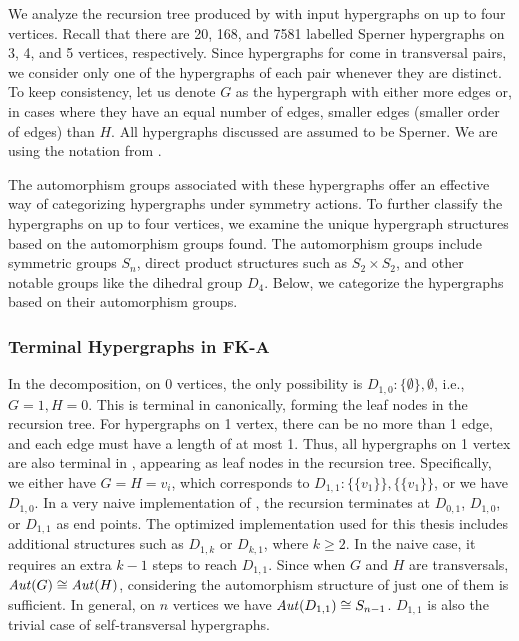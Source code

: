 We analyze the recursion tree produced by \FKA{} with input hypergraphs on up to four vertices. Recall that there are 20, 168, and 7581 labelled Sperner hypergraphs on 3, 4, and 5 vertices, respectively. Since hypergraphs for \FKA{} come in transversal pairs, we consider only one of the hypergraphs of each pair whenever they are distinct. To keep consistency, let us denote $G$ as the hypergraph with either more edges or, in cases where they have an equal number of edges, smaller edges (smaller order of edges) than $H$. All hypergraphs discussed are assumed to be Sperner. We are using the notation from \cite{SS24}.

The automorphism groups associated with these hypergraphs offer an effective way of categorizing hypergraphs under symmetry actions. To further classify the hypergraphs on up to four vertices, we examine the unique hypergraph structures based on the automorphism groups found. The automorphism groups include symmetric groups $S_n$, direct product structures such as $S_2\times S_2$, and other notable groups like the dihedral group $D_4$. Below, we categorize the hypergraphs based on their automorphism groups.

\subsubsection*{Terminal Hypergraphs in FK-A}

In the \FKA{} decomposition, on 0 vertices, the only possibility is $D_{1,0}:\{\emptyset\},\emptyset$, i.e., $G=1,H=0$. This is terminal in \FKA{} canonically, forming the leaf nodes in the recursion tree. For hypergraphs on 1 vertex, there can be no more than 1 edge, and each edge must have a length of at most 1. Thus, all hypergraphs on 1 vertex are also terminal in \FKA, appearing as leaf nodes in the recursion tree. Specifically, we either have $G=H=v_i$, which corresponds to $D_{1,1}:\{\{v_1\}\},\{\{v_1\}\}$, or we have $D_{1,0}$. In a very naive implementation of \FKA, the recursion terminates at $D_{0,1}$, $D_{1,0}$, or $D_{1,1}$ as end points. The optimized implementation used for this thesis includes additional structures such as $D_{1,k}$ or $D_{k,1}$, where $k\geq 2$. In the naive case, it requires an extra $k-1$ steps to reach $D_{1,1}$. Since when $G$ and $H$ are transversals, $\mathit{Aut}(G)\cong\mathit{Aut}(H)$, considering the automorphism structure of just one of them is sufficient. In general, on $n$ vertices we have $\mathit{Aut}(D_{1,1})\cong S_{n-1}$. $D_{1,1}$ is also the trivial case of self-transversal hypergraphs.

